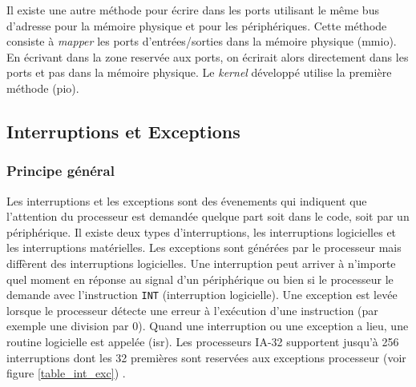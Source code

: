 Il existe une autre méthode pour écrire dans les ports utilisant le même bus d'adresse
pour la mémoire physique et pour les périphériques. Cette méthode consiste à
\textit{mapper} les ports d'entrées/sorties dans la mémoire physique (\acrshort{mmio}).
En écrivant dans la zone reservée aux ports, on écrirait alors directement dans
les ports et pas dans la mémoire physique. Le \textit{kernel} développé utilise
la première méthode (\acrshort{pio}).


\subsection{Interruptions et Exceptions}
\subsubsection{Principe général}
Les interruptions et les exceptions sont des évenements qui indiquent que l'attention
du processeur est demandée quelque part soit dans le code, soit par un périphérique.
Il existe deux types d'interruptions, les interruptions logicielles et les interruptions
matérielles. Les exceptions sont générées par le processeur mais diffèrent des
interruptions logicielles. Une interruption peut arriver à n'importe quel moment
en réponse au signal d'un périphérique ou bien si le processeur le demande
avec l'instruction \texttt{INT} (interruption logicielle). Une exception
est levée lorsque le processeur détecte une erreur à l'exécution d'une instruction
(par exemple une division par 0). Quand une interruption ou une exception
a lieu, une routine logicielle est appelée (\acrshort{isr}). Les processeurs \acrshort{IA-32}
supportent jusqu'à 256 interruptions dont les 32 premières sont reservées aux exceptions
processeur (voir figure \ref{table_int_exc}) \cite{ref42,ref66}. \\


